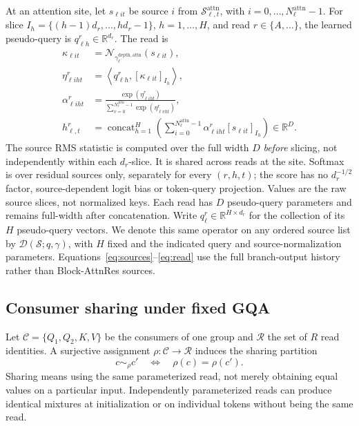 \documentclass[11pt,letterpaper]{article}
\begin{document}
At an attention site, let $s_{\ell i t}$ be source $i$ from
$\mathcal{S}^{\mathrm{attn}}_{\ell,t}$, with $i=0,\ldots,N^{\mathrm{attn}}_\ell-1$.
For slice $I_h=\{(h-1)d_r,\ldots,hd_r-1\}$, $h=1,\ldots,H$, and read
$r\in\{A,\ldots\}$, the learned pseudo-query is
$q^r_{\ell h}\in\mathbb{R}^{d_r}$. The read is
\begin{align}
 \kappa_{\ell i t}
   &=\mathcal{N}_{\gamma^{\mathrm{depth,attn}}_\ell}(s_{\ell i t}),\\
 \eta^r_{\ell iht}
   &=\left\langle q^r_{\ell h},[\kappa_{\ell i t}]_{I_h}\right\rangle,\\
 \alpha^r_{\ell iht}
   &=\frac{\exp(\eta^r_{\ell iht})}
   {\sum_{v=0}^{N^{\mathrm{attn}}_\ell-1}\exp(\eta^r_{\ell vht})},\\
 h^r_{\ell,t}
   &=\operatorname{concat}_{h=1}^{H}
   \left(\sum_{i=0}^{N^{\mathrm{attn}}_\ell-1}
   \alpha^r_{\ell iht}[s_{\ell i t}]_{I_h}\right)
   \in\mathbb{R}^{D}.
 \label{eq:read}
\end{align}
The source RMS statistic is computed over the full width $D$ \emph{before}
slicing, not independently within each $d_r$-slice. It is shared across reads
at the site. Softmax is over residual sources only, separately for every
$(r,h,t)$; the score has no $d_r^{-1/2}$ factor, source-dependent logit bias or
token-query projection. Values are the raw source slices, not normalized keys.
Each read has $D$ pseudo-query parameters and remains full-width after
concatenation. Write $q^r_\ell\in\mathbb R^{H\times d_r}$ for the
collection of its $H$ pseudo-query vectors. We denote this same operator on any ordered source list by
$\mathcal{D}(\mathcal{S};q,\gamma)$, with $H$ fixed and the indicated query and
source-normalization parameters. Equations~\ref{eq:sources}--\ref{eq:read}
use the full branch-output history rather than Block-AttnRes sources.

\subsection{Consumer sharing under fixed GQA}
Let $\mathcal{C}=\{Q_1,Q_2,K,V\}$ be the consumers of one group and
$\mathcal{R}$ the set of $R$ read identities. A surjective assignment
$\rho:\mathcal{C}\to\mathcal{R}$ induces the sharing partition
\begin{equation}
 c\sim_\rho c'\quad\Longleftrightarrow\quad\rho(c)=\rho(c').
 \label{eq:sharing}
\end{equation}
Sharing means using the same parameterized read, not merely obtaining equal
values on a particular input. Independently parameterized reads can produce
identical mixtures at initialization or on individual tokens without being
the same read.
\end{document}
